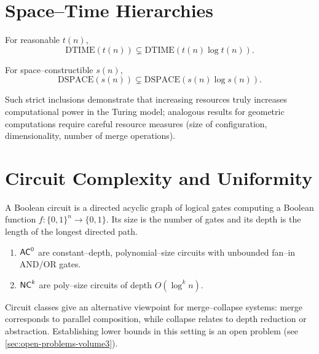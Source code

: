 \section{Space--Time Hierarchies}

\begin{theorem}
For reasonable $t(n)$,
\[
\mathrm{DTIME}(t(n)) \subsetneq \mathrm{DTIME}(t(n)\log t(n)).
\]
\end{theorem}

\begin{theorem}
For space--constructible $s(n)$,
\[
\mathrm{DSPACE}(s(n)) \subsetneq \mathrm{DSPACE}(s(n)\log s(n)).
\]
\end{theorem}

\begin{remark}
Such strict inclusions demonstrate that increasing resources truly increases
computational power in the Turing model; analogous results for geometric
computations require careful resource measures (size of configuration,
dimensionality, number of merge operations).
\end{remark}

\section{Circuit Complexity and Uniformity}

\begin{definition}
A Boolean circuit is a directed acyclic graph of logical gates computing a
Boolean function $f:\{0,1\}^n\to \{0,1\}$.
Its size is the number of gates and its depth is the length of the longest
directed path.
\end{definition}

\begin{definition}
\begin{enumerate}
  \item ${\sf AC}^0$ are constant--depth, polynomial--size circuits with
        unbounded fan--in AND/OR gates.
  \item ${\sf NC}^k$ are poly--size circuits of depth $O(\log^k n)$.
\end{enumerate}
\end{definition}

\begin{remark}
Circuit classes give an alternative viewpoint for merge--collapse systems:
merge corresponds to parallel composition, while collapse relates to depth
reduction or abstraction.  Establishing lower bounds in this setting is an
open problem (see \cref{sec:open-problems-volume3}).
\end{remark}

